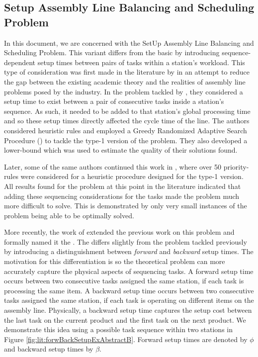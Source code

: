 \subsection{Setup Assembly Line Balancing and Scheduling Problem}
\label{sec:lit:SUALBSP}
In this document, we are concerned with the SetUp Assembly Line Balancing and Scheduling Problem.
This variant differs from the basic \sab{} by introducing
sequence-dependent setup times between pairs of tasks
within a station's workload.
This type of consideration was first made in the literature by 
in an attempt to reduce the gap between the existing academic theory
and the realities of assembly line problems posed by the industry.
In the problem tackled by \citeauthor{Andres2008},
they considered a setup time to exist between
a pair of consecutive tasks inside a station's sequence.
As such, it needed to be added to that station's
global processing time
and so these setup times directly affected
the cycle time of the line.
The authors considered heuristic rules and employed a Greedy
Randomized Adaptive Search Procedure (\grasp) to tackle the
type-1 version of the problem.
They also developed a lower-bound which was used
to estimate the quality of their solutions found.

Later, some of the same authors continued this work in
, where over 50 priority-rules were considered
for a heuristic procedure designed for the type-1 version.
All results found for the problem at this point in the 
literature indicated that adding these sequencing considerations
for the tasks made the problem much more difficult to solve.
This is demonstrated by only very small instances of the problem
being able to be optimally solved.

More recently, the work of  extended the previous
work on this problem and formally named it the \sua{}.
The \sua{} differs slightly from the problem tackled previously
by introducing a distinguishment between \emph{forward} and \emph{backward}
setup times.
The motivation for this differentiation is so the theoretical
problem can more accurately capture the physical aspects
of sequencing tasks.
A forward setup time occurs between two consecutive tasks assigned the same station,
if each task is processing the same item.
A backward setup time occurs between two consecutive tasks assigned the same station,
if each task is operating on different items on the assembly line.
Physically, a backward setup time captures the setup cost between the last task on the current
product and the first task on the next product.
We demonstrate this idea using 
a possible task sequence within two stations in Figure \ref{fig:lit:forwBackSetupExAbstractB}.
Forward setup times are denoted by $\phi$ and backward setup times
by $\beta$.

